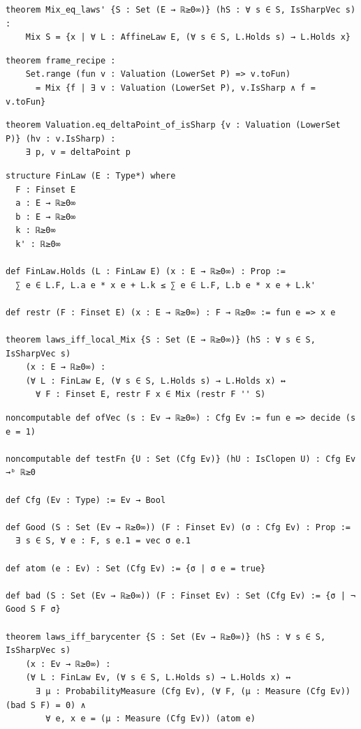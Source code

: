 \label{lean:mix-eq-laws}
\begin{lstlisting}
theorem Mix_eq_laws' {S : Set (E → ℝ≥0∞)} (hS : ∀ s ∈ S, IsSharpVec s) :
    Mix S = {x | ∀ L : AffineLaw E, (∀ s ∈ S, L.Holds s) → L.Holds x}
\end{lstlisting}

\label{lean:frame-recipe}
\begin{lstlisting}
theorem frame_recipe :
    Set.range (fun v : Valuation (LowerSet P) => v.toFun)
      = Mix {f | ∃ v : Valuation (LowerSet P), v.IsSharp ∧ f = v.toFun}
\end{lstlisting}

\label{lean:eq-deltapoint-of-issharp}
\begin{lstlisting}
theorem Valuation.eq_deltaPoint_of_isSharp {v : Valuation (LowerSet P)} (hv : v.IsSharp) :
    ∃ p, v = deltaPoint p
\end{lstlisting}

\label{lean:laws-iff-local-mix}
\begin{lstlisting}
structure FinLaw (E : Type*) where
  F : Finset E
  a : E → ℝ≥0∞
  b : E → ℝ≥0∞
  k : ℝ≥0∞
  k' : ℝ≥0∞

def FinLaw.Holds (L : FinLaw E) (x : E → ℝ≥0∞) : Prop :=
  ∑ e ∈ L.F, L.a e * x e + L.k ≤ ∑ e ∈ L.F, L.b e * x e + L.k'

def restr (F : Finset E) (x : E → ℝ≥0∞) : F → ℝ≥0∞ := fun e => x e

theorem laws_iff_local_Mix {S : Set (E → ℝ≥0∞)} (hS : ∀ s ∈ S, IsSharpVec s)
    (x : E → ℝ≥0∞) :
    (∀ L : FinLaw E, (∀ s ∈ S, L.Holds s) → L.Holds x) ↔
      ∀ F : Finset E, restr F x ∈ Mix (restr F '' S)
\end{lstlisting}

\label{lean:laws-iff-barycenter}
\begin{lstlisting}
noncomputable def ofVec (s : Ev → ℝ≥0∞) : Cfg Ev := fun e => decide (s e = 1)

noncomputable def testFn {U : Set (Cfg Ev)} (hU : IsClopen U) : Cfg Ev →ᵇ ℝ≥0

def Cfg (Ev : Type) := Ev → Bool

def Good (S : Set (Ev → ℝ≥0∞)) (F : Finset Ev) (σ : Cfg Ev) : Prop :=
  ∃ s ∈ S, ∀ e : F, s e.1 = vec σ e.1

def atom (e : Ev) : Set (Cfg Ev) := {σ | σ e = true}

def bad (S : Set (Ev → ℝ≥0∞)) (F : Finset Ev) : Set (Cfg Ev) := {σ | ¬ Good S F σ}

theorem laws_iff_barycenter {S : Set (Ev → ℝ≥0∞)} (hS : ∀ s ∈ S, IsSharpVec s)
    (x : Ev → ℝ≥0∞) :
    (∀ L : FinLaw Ev, (∀ s ∈ S, L.Holds s) → L.Holds x) ↔
      ∃ μ : ProbabilityMeasure (Cfg Ev), (∀ F, (μ : Measure (Cfg Ev)) (bad S F) = 0) ∧
        ∀ e, x e = (μ : Measure (Cfg Ev)) (atom e)
\end{lstlisting}

